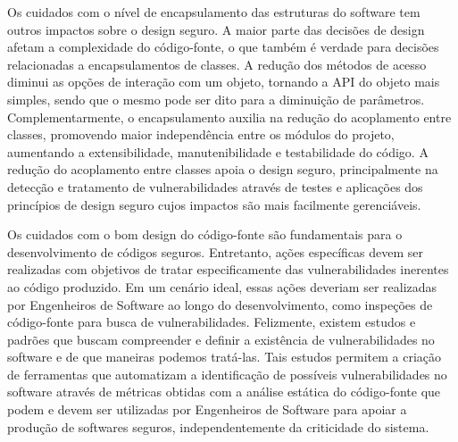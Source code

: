 %

Os cuidados com o nível de encapsulamento das estruturas do software tem outros impactos sobre o design seguro. A maior parte das decisões de design afetam a complexidade do código-fonte, o que também é verdade para decisões relacionadas a encapsulamentos de classes. A redução dos métodos de acesso diminui as opções de interação com um objeto, tornando a API do objeto mais simples, sendo que o mesmo pode ser dito para a diminuição de parâmetros. Complementarmente, o encapsulamento auxilia na redução do acoplamento entre classes, promovendo maior independência entre os módulos do projeto, aumentando a extensibilidade, manutenibilidade e testabilidade do código. A redução do acoplamento entre classes apoia o design seguro, principalmente na detecção e tratamento de vulnerabilidades através de testes e aplicações dos princípios de design seguro cujos impactos são mais facilmente gerenciáveis.

%


Os cuidados com o bom design do código-fonte são fundamentais para o desenvolvimento de códigos seguros. Entretanto, ações específicas devem ser realizadas com objetivos de tratar especificamente das vulnerabilidades inerentes ao código produzido. Em um cenário ideal, essas ações deveriam ser realizadas por Engenheiros de Software ao longo do desenvolvimento, como inspeções de código-fonte para busca de vulnerabilidades. Felizmente, existem estudos e padrões que buscam compreender e definir a existência de vulnerabilidades no software e de que maneiras podemos tratá-las. Tais estudos permitem a criação de ferramentas que automatizam a identificação de possíveis vulnerabilidades no software através de métricas obtidas com a análise estática do código-fonte que podem e devem ser utilizadas por Engenheiros de Software para apoiar a produção de softwares seguros, independentemente da criticidade do sistema. 

%


%



